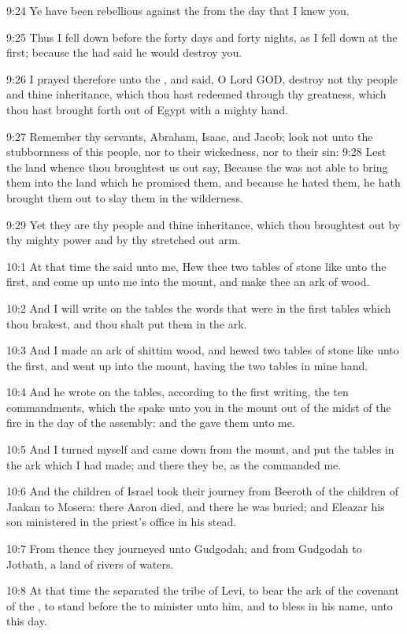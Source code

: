 9:24 Ye have been rebellious against the \LORD from the day that I knew
you.

9:25 Thus I fell down before the \LORD forty days and forty nights, as
I fell down at the first; because the \LORD had said he would destroy
you.

9:26 I prayed therefore unto the \LORD, and said, O Lord GOD, destroy
not thy people and thine inheritance, which thou hast redeemed through
thy greatness, which thou hast brought forth out of Egypt with a
mighty hand.

9:27 Remember thy servants, Abraham, Isaac, and Jacob; look not unto
the stubbornness of this people, nor to their wickedness, nor to their
sin: 9:28 Lest the land whence thou broughtest us out say, Because the
\LORD was not able to bring them into the land which he promised them,
and because he hated them, he hath brought them out to slay them in
the wilderness.

9:29 Yet they are thy people and thine inheritance, which thou
broughtest out by thy mighty power and by thy stretched out arm.

10:1 At that time the \LORD said unto me, Hew thee two tables of stone
like unto the first, and come up unto me into the mount, and make thee
an ark of wood.

10:2 And I will write on the tables the words that were in the first
tables which thou brakest, and thou shalt put them in the ark.

10:3 And I made an ark of shittim wood, and hewed two tables of stone
like unto the first, and went up into the mount, having the two tables
in mine hand.

10:4 And he wrote on the tables, according to the first writing, the
ten commandments, which the \LORD spake unto you in the mount out of
the midst of the fire in the day of the assembly: and the \LORD gave
them unto me.

10:5 And I turned myself and came down from the mount, and put the
tables in the ark which I had made; and there they be, as the \LORD
commanded me.

10:6 And the children of Israel took their journey from Beeroth of the
children of Jaakan to Mosera: there Aaron died, and there he was
buried; and Eleazar his son ministered in the priest's office in his
stead.

10:7 From thence they journeyed unto Gudgodah; and from Gudgodah to
Jotbath, a land of rivers of waters.

10:8 At that time the \LORD separated the tribe of Levi, to bear the
ark of the covenant of the \LORD, to stand before the \LORD to minister
unto him, and to bless in his name, unto this day.

